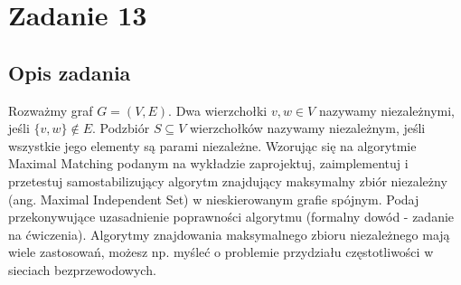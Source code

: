\documentclass{article}
\begin{document}
    \begin{table}[H]
        \begin{center}
        \end{center}
        \caption{Wyniki dla przypadków testowych z pliku \textit{gapd.txt}. (*) $cap / cap_{max}$ przedstawia stosunek użytej pojemności maszyny 
            w wyznaczonym rozwiązaniu do maksymalnej pojemności maszyny. W tabeli przedstawiono minimalny, średni i maksymalny stosunek.}
        \label{wyniki-d}
    \end{table}


    \section{Zadanie 13}
	\subsection{Opis zadania}
    Rozważmy graf $G= (V,E)$. Dwa wierzchołki $v,w \in V$ nazywamy niezależnymi, jeśli $\{v,w\} \notin E$. Podzbiór $S \subseteq V$ wierzchołków 
    nazywamy niezależnym, jeśli wszystkie jego elementy są parami niezależne. Wzorując się na algorytmie Maximal Matching podanym na wykładzie 
    zaprojektuj, zaimplementuj i przetestuj samostabilizujący algorytm znajdujący maksymalny zbiór niezależny (ang. Maximal Independent Set) 
    w nieskierowanym grafie spójnym. Podaj przekonywujące uzasadnienie poprawności algorytmu (formalny dowód - zadanie na ćwiczenia). 
    Algorytmy znajdowania maksymalnego zbioru niezależnego mają wiele zastosowań, możesz np. myśleć o problemie przydziału częstotliwości 
    w sieciach bezprzewodowych.
    
\end{document}

